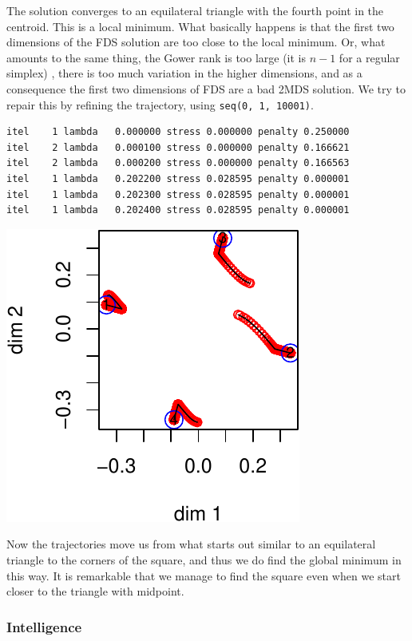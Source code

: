 \documentclass[
  12pt,
  letterpaper,
  DIV=11,
  numbers=noendperiod]{scrreprt}
\theoremstyle{remark}
\begin{document}
The solution converges to an equilateral triangle with the fourth point
in the centroid. This is a local minimum. What basically happens is that
the first two dimensions of the FDS solution are too close to the local
minimum. Or, what amounts to the same thing, the Gower rank is too large
(it is \(n-1\) for a regular simplex) , there is too much variation in
the higher dimensions, and as a consequence the first two dimensions of
FDS are a bad 2MDS solution. We try to repair this by refining the
trajectory, using \texttt{seq(0,\ 1,\ 10001)}.

\begin{verbatim}
itel    1 lambda   0.000000 stress 0.000000 penalty 0.250000 
itel    2 lambda   0.000100 stress 0.000000 penalty 0.166621 
itel    2 lambda   0.000200 stress 0.000000 penalty 0.166563 
itel    1 lambda   0.202200 stress 0.028595 penalty 0.000001 
itel    1 lambda   0.202300 stress 0.028595 penalty 0.000001 
itel    1 lambda   0.202400 stress 0.028595 penalty 0.000001 
\end{verbatim}

\begin{center}
\includegraphics{global_files/figure-pdf/simplex4b-1.pdf}
\end{center}

Now the trajectories move us from what starts out similar to an
equilateral triangle to the corners of the square, and thus we do find
the global minimum in this way. It is remarkable that we manage to find
the square even when we start closer to the triangle with midpoint.

\subsubsection{Intelligence}\label{intelligence}
\end{document}
